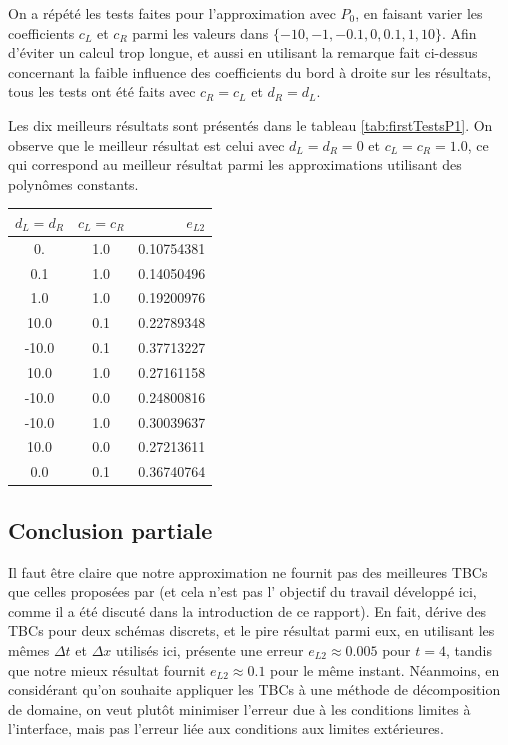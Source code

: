 \indent On a répété les tests faites pour l'approximation avec $P_0$, en faisant varier les coefficients $c_L$ et $c_R$ parmi les valeurs dans $\{-10,-1,-0.1,0,0.1,1,10\}$. Afin d'éviter un calcul trop longue, et aussi en utilisant la remarque fait ci-dessus concernant la faible influence des coefficients du bord à droite sur les résultats, tous les tests ont été faits avec $c_R = c_L$ et $d_R = d_L$.

\indent Les dix meilleurs résultats sont présentés dans le tableau \ref{tab:firstTestsP1}. On observe que le meilleur résultat est celui avec $d_L = d_R = 0$ et $c_L = c_R = 1.0 $, ce qui correspond au meilleur résultat parmi les approximations utilisant des polynômes constants.


\begin{center}
\begin{tabular}{c|c|S[round-precision=4,table-number-alignment =  left]}
	  &  &  \\
	. & 1.0 & 0.10754381 \\
	0.1 & 1.0 & 0.14050496 \\
	1.0 & 1.0 & 0.19200976 \\
	10.0 & 0.1 & 0.22789348 \\
	-10.0 & 0.1 & 0.37713227 \\
	10.0 & 1.0 & 0.27161158 \\
	-10.0 &  0.0 & 0.24800816\\
	-10.0 & 1.0 & 0.30039637 \\
	10.0 & 0.0 & 0.27213611 \\
	0.0 & 0.1 & 0.36740764
\end{tabular}
\end{center}

\subsection{Conclusion partiale}

\indent Il faut être claire que notre approximation ne fournit pas des meilleures TBCs que celles proposées par \cite{besse2015} (et cela n'est pas l' objectif du travail développé ici, comme il a été discuté dans la introduction de ce rapport). En fait, \cite{besse2015} dérive des TBCs pour deux schémas discrets, et le pire résultat parmi eux, en utilisant les mêmes $\Delta t$ et $\Delta x$ utilisés ici, présente une erreur $e_{L2} \approx 0.005$ pour $t = 4$, tandis que notre mieux résultat fournit $e_{L2} \approx 0.1$ pour le même instant. Néanmoins, en considérant qu'on souhaite appliquer les TBCs à une méthode de décomposition de domaine, on veut plutôt minimiser l'erreur due à les conditions limites à l'interface, mais pas l'erreur liée aux conditions aux limites extérieures.


